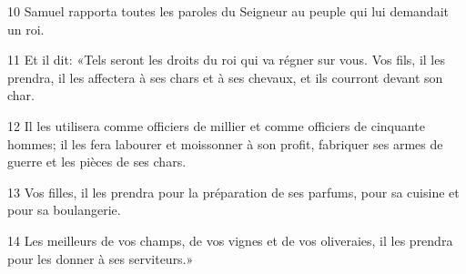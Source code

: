 
10 Samuel rapporta toutes les paroles du Seigneur au peuple qui lui demandait un roi.

11 Et il dit: «Tels seront les droits du roi qui va régner sur vous. Vos fils, il les prendra, il les affectera à ses chars et à ses chevaux, et ils courront devant son char.

12 Il les utilisera comme officiers de millier et comme officiers de cinquante hommes; il les fera labourer et moissonner à son profit, fabriquer ses armes de guerre et les pièces de ses chars.

13 Vos filles, il les prendra pour la préparation de ses parfums, pour sa cuisine et pour sa boulangerie.

14 Les meilleurs de vos champs, de vos vignes et de vos oliveraies, il les prendra pour les donner à ses serviteurs.»